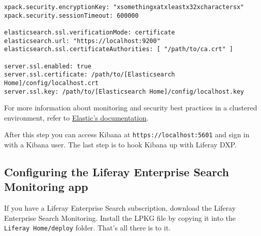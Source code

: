 \begin{verbatim}
xpack.security.encryptionKey: "xsomethingxatxleastx32xcharactersx"
xpack.security.sessionTimeout: 600000

elasticsearch.ssl.verificationMode: certificate
elasticsearch.url: "https://localhost:9200"
elasticsearch.ssl.certificateAuthorities: [ "/path/to/ca.crt" ]

server.ssl.enabled: true
server.ssl.certificate: /path/to/[Elasticsearch Home]/config/localhost.crt
server.ssl.key: /path/to/[Elasticsearch Home]/config/localhost.key
\end{verbatim}

For more information about monitoring and security best practices in a
clustered environment, refer to
\href{https://www.elastic.co/guide/en/x-pack/6.1/secure-monitoring.html}{Elastic's
documentation}.

After this step you can access Kibana at \texttt{https://localhost:5601}
and sign in with a Kibana user. The last step is to hook Kibana up with
Liferay DXP.

\subsection{Configuring the Liferay Enterprise Search Monitoring
app}\label{configuring-the-liferay-enterprise-search-monitoring-app-1}

If you have a Liferay Enterprise Search subscription, download the
Liferay Enterprise Search Monitoring. Install the LPKG file by copying
it into the \texttt{Liferay\ Home/deploy} folder. That's all there is to
it.


